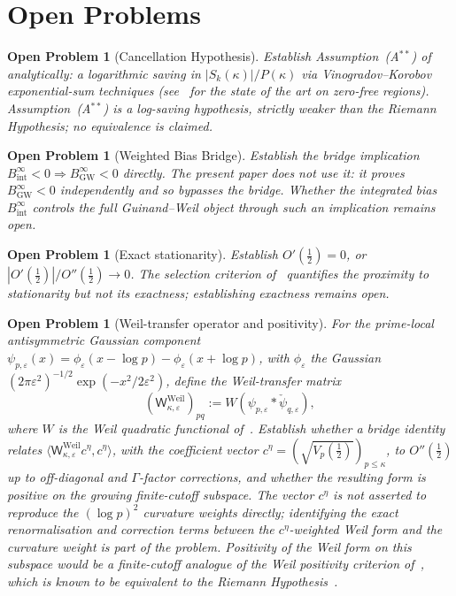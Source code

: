 \documentclass[11pt]{article}
\newtheorem{openproblem}[theorem]{Open Problem}
\newcommand{\BinfGW}{B_{\mathrm{GW}}^{\infty}}   %
\begin{document}
\section{Open Problems}
\label{sec:open}

\begin{openproblem}[Cancellation Hypothesis]
\label{op:cancel}
Establish Assumption~(A$^{**}$) of~\cite{Paper7} analytically: a logarithmic
saving in $|S_k(\kappa)|/P(\kappa)$ via Vinogradov--Korobov exponential-sum
techniques (see~\cite{MossinghoffTrudgianYang24,Bellotti24a} for the state
of the art on zero-free regions).
Assumption~(A$^{**}$) is a log-saving hypothesis, strictly weaker than the
Riemann Hypothesis; no equivalence is claimed.
\end{openproblem}

\begin{openproblem}[Weighted Bias Bridge]
\label{op:bridge}
Establish the bridge implication
$B_{\mathrm{int}}^\infty<0\Rightarrow\BinfGW<0$ directly. The present paper
does not use it: it proves $\BinfGW<0$ independently and so bypasses the
bridge. Whether the integrated bias $B_{\mathrm{int}}^\infty$ controls the
full Guinand--Weil object through such an implication remains open.
\end{openproblem}

\begin{openproblem}[Exact stationarity]
\label{op:stat}
Establish $O'(\tfrac12)=0$, or $|O'(\tfrac12)|/O''(\tfrac12)\to 0$.
The selection criterion of~\cite{Paper7} quantifies the proximity to
stationarity but not its exactness; establishing exactness remains open.
\end{openproblem}

\begin{openproblem}[Weil-transfer operator and positivity]
\label{op:weil}
For the prime-local antisymmetric Gaussian component
$\psi_{p,\varepsilon}(x)=\phi_\varepsilon(x-\log p)-\phi_\varepsilon(x+\log p)$,
with $\phi_\varepsilon$ the Gaussian
$(2\pi\varepsilon^2)^{-1/2}\exp(-x^2/2\varepsilon^2)$, define the
Weil-transfer matrix
\[
(\mathsf{W}^{\mathrm{Weil}}_{\kappa,\varepsilon})_{pq}
:=W(\psi_{p,\varepsilon}\ast\check\psi_{q,\varepsilon}),
\]
where $W$ is the
Weil quadratic functional of~\cite{Lagarias,Bombieri}.
Establish whether a bridge identity relates
$\langle\mathsf{W}^{\mathrm{Weil}}_{\kappa,\varepsilon}c^\eta,c^\eta\rangle$,
with the coefficient vector $c^\eta=(\sqrt{V_p(\tfrac12)})_{p\le\kappa}$,
to $O''(\tfrac12)$ up to off-diagonal and $\Gamma$-factor corrections, and
whether the resulting form is positive on the growing finite-cutoff
subspace.
The vector $c^\eta$ is not asserted to reproduce the $(\log p)^2$ curvature
weights directly; identifying the exact renormalisation and correction terms
between the $c^\eta$-weighted Weil form and the curvature weight is part of
the problem.
Positivity of the Weil form on this subspace would be a finite-cutoff
analogue of the Weil positivity criterion of~\cite{Lagarias}, which is known
to be equivalent to the Riemann Hypothesis~\cite{Lagarias,Bombieri}.
\end{openproblem}
\end{document}
